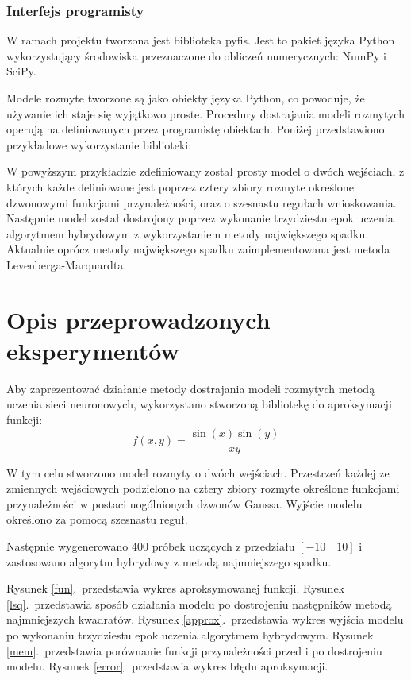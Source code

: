 \documentclass[a4paper,12pt,titlepage]{article}
\begin{document}
\subsubsection*{Interfejs programisty}
W ramach projektu tworzona jest biblioteka pyfis. Jest to pakiet języka Python wykorzystujący środowiska przeznaczone do obliczeń numerycznych: NumPy i SciPy.

Modele rozmyte tworzone są jako obiekty języka Python, co powoduje, że używanie ich staje się wyjątkowo proste. Procedury dostrajania modeli rozmytych operują na definiowanych przez programistę obiektach. Poniżej przedstawiono przykładowe wykorzystanie biblioteki:



W powyższym przykładzie zdefiniowany został prosty model o dwóch wejściach, z których każde definiowane jest poprzez cztery zbiory rozmyte określone dzwonowymi funkcjami przynależności, oraz o szesnastu regułach wnioskowania. Następnie model został dostrojony poprzez wykonanie trzydziestu epok uczenia algorytmem hybrydowym z wykorzystaniem metody największego spadku. Aktualnie oprócz metody największego spadku zaimplementowana jest metoda Levenberga-Marquardta.

\section{Opis przeprowadzonych eksperymentów}

Aby zaprezentować działanie metody dostrajania modeli rozmytych metodą uczenia sieci neuronowych, wykorzystano stworzoną bibliotekę do aproksymacji funkcji:
\begin{equation}
f(x,y) = \frac{\sin(x)\sin(y)}{xy}
\end{equation}

W tym celu stworzono model rozmyty o dwóch wejściach. Przestrzeń każdej ze zmiennych wejściowych podzielono na cztery zbiory rozmyte określone funkcjami przynależności w postaci uogólnionych dzwonów Gaussa. Wyjście modelu określono za pomocą szesnastu reguł.

Następnie wygenerowano 400 próbek uczących z przedziału $[-10\quad10]$ i zastosowano algorytm hybrydowy z metodą najmniejszego spadku.

Rysunek \ref{fun}.\ przedstawia wykres aproksymowanej funkcji. Rysunek \ref{lsq}.\ przedstawia sposób działania modelu po dostrojeniu następników metodą najmniejszych kwadratów. Rysunek \ref{approx}.\ przedstawia wykres wyjścia modelu po wykonaniu trzydziestu epok uczenia algorytmem hybrydowym. Rysunek \ref{mem}.\ przedstawia porównanie funkcji przynależności przed i po dostrojeniu modelu. Rysunek \ref{error}.\ przedstawia wykres błędu aproksymacji.
\end{document}
